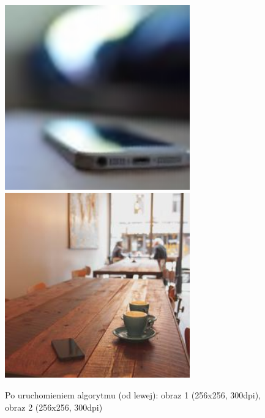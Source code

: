 \documentclass[a4paper,12pt]{book}
\begin{document}
\begin{figure}
	\caption{Po uruchomieniem algorytmu (od lewej): obraz 1 (256x256, 300dpi), obraz 2 (256x256, 300dpi)}
	\includegraphics[width=8cm, height=8cm]{phone-rastar-unification.png}
	\includegraphics[width=8cm, height=8cm]{coffee-unmodified.jpg}
\end{figure}
\newpage
\end{document}

